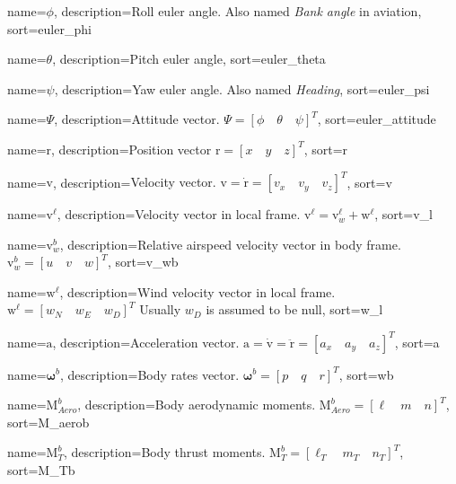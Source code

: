 {
	name={$\phi$},
  	description={Roll euler angle. Also named \textit{Bank angle} in aviation},
  	sort=euler_phi
}

{
	name={$\theta$},
  	description={Pitch euler angle},
  	sort=euler_theta
}

{
	name={$\psi$},
  	description={Yaw euler angle. Also named \textit{Heading}},
	sort=euler_psi
}

{
	name={$\Psi$},
	description={Attitude vector. $\Psi = [\phi \quad \theta \quad \psi]^T$},
	sort=euler_attitude
}

{
	name={$\bm{\mathrm{r}}$},
	description={Position vector $\bm{\mathrm{r}} = [x \quad y \quad z]^{T}$},
  	sort=r
}

{
	name={$\bm{\mathrm{v}}$},
	description={Velocity vector. $\bm{\mathrm{v}} = \bm{\mathrm{\dot{r}}} = [v_x \quad v_y \quad v_z]^T$},
	sort=v
}

{
	name={$\bm{\mathrm{v}}^\ell$},
	description={Velocity vector in local frame. $\bm{\mathrm{v}}^\ell = \bm{\mathrm{v}}_w^\ell + \bm{\mathrm{w}}^\ell$},
	sort=v_l
}

{
	name={$\bm{\mathrm{v}}_w^b$},
	description={Relative airspeed velocity vector in body frame. $\bm{\mathrm{v}}_w^b = [u \quad v \quad w]^T$},
	sort=v_wb
}

{
	name={$\bm{\mathrm{w}}^\ell$},
	description={Wind velocity vector in local frame. $\bm{\mathrm{w}}^\ell = [w_N \quad w_E \quad w_D]^T$
				 Usually $w_D$ is assumed to be null},
	sort=w_l
}


{
	name={$\bm{\mathrm{a}}$},
	description={Acceleration vector. $\bm{\mathrm{a}} = \bm{\mathrm{\dot{v}}} = \bm{\mathrm{\ddot{r}}} = [a_x \quad a_y \quad a_z]^T$},
	sort=a
}

{
	name={$\bm{\omega}^b$},
	description={Body rates vector. $\bm{\omega}^b = [p \quad q \quad r]^T$},
	sort=wb
}

{
	name={$\bm{\mathrm{M}}_{Aero}^b$},
	description={Body aerodynamic moments. $\bm{\mathrm{M}}_{Aero}^b = [\ell \quad m \quad n]^T$},
	sort=M_aerob
}

{
	name={$\bm{\mathrm{M}}_T^b$},
	description={Body thrust moments. $\bm{\mathrm{M}}_T^b = [\ell_T \quad m_T \quad n_T]^T$},
	sort=M_Tb
}

